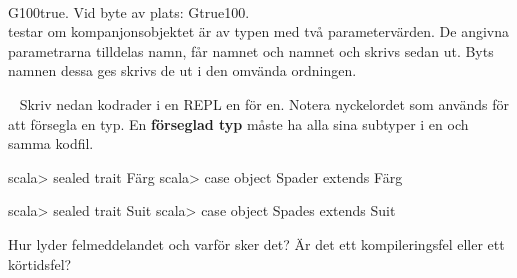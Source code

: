%

\SOLUTION


\TaskSolved \what \\
G100true. Vid byte av plats: Gtrue100.\\
 testar om kompanjonsobjektet \ifswedish{}\else{}\fi{} är av typen \ifswedish{}\else{}\fi{} med två parametervärden. De angivna parametrarna tilldelas namn, \ifswedish{}\else{}\fi{} får namnet  och \ifswedish{}\else{}\fi{} namnet \ifswedish{}\else{}\fi{} och skrivs sedan ut. Byts namnen dessa ges skrivs de ut i den omvända ordningen.






\QUESTEND








\QUESTBEGIN

\Task	\label{task:match-sealedtrait} \what~	Skriv nedan kodrader i en REPL en för en. Notera nyckelordet  som används för att försegla en typ. En \textbf{förseglad typ} måste ha alla sina subtyper i en och samma kodfil.
\ifswedish
\begin{REPL}
scala> sealed trait Färg
scala> case object Spader extends Färg
\end{REPL}
\else
\begin{REPL}
scala> sealed trait Suit
scala> case object Spades extends Suit
\end{REPL}
\fi
\Subtask Hur lyder felmeddelandet och varför sker det? Är det ett kompileringsfel eller ett körtidsfel?

